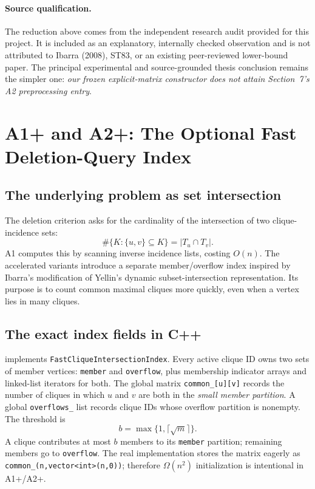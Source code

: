 \paragraph{Source qualification.} The reduction above comes from the independent research audit provided for this project.  It is included as an explanatory, internally checked observation and is not attributed to Ibarra (2008), ST83, or an existing peer-reviewed lower-bound paper.  The principal experimental and source-grounded thesis conclusion remains the simpler one: \emph{our frozen explicit-matrix constructor does not attain Section~7's A2 preprocessing entry}.

\section{A1+ and A2+: The Optional Fast Deletion-Query Index}
\label{sec:plus-full}
\subsection{The underlying problem as set intersection}
The deletion criterion asks for the cardinality of the intersection of two clique-incidence sets:
\[
\#\{K:\{u,v\}\subseteq K\}=|T_u\cap T_v|.
\]
A1 computes this by scanning inverse incidence lists, costing \(O(n)\).  The accelerated variants introduce a separate member/overflow index inspired by Ibarra's modification of Yellin's dynamic subset-intersection representation.  Its purpose is to count common maximal cliques more quickly, even when a vertex lies in many cliques.

\subsection{The exact index fields in C++}
 implements \texttt{FastCliqueIntersectionIndex}.  Every active clique ID owns two sets of member vertices: \texttt{member} and \texttt{overflow}, plus membership indicator arrays and linked-list iterators for both.  The global matrix \texttt{common\_[u][v]} records the number of cliques in which \(u\) and \(v\) are both in the \emph{small member partition}.  A global \texttt{overflows\_} list records clique IDs whose overflow partition is nonempty.  The threshold is
\[
b=\max\{1,\lceil\sqrt m\rceil\}.
\]
A clique contributes at most \(b\) members to its \texttt{member} partition; remaining members go to \texttt{overflow}.  The real implementation stores the matrix eagerly as \texttt{common\_(n,vector<int>(n,0))}; therefore \(\Omega(n^2)\) initialization is intentional in A1+/A2+.

